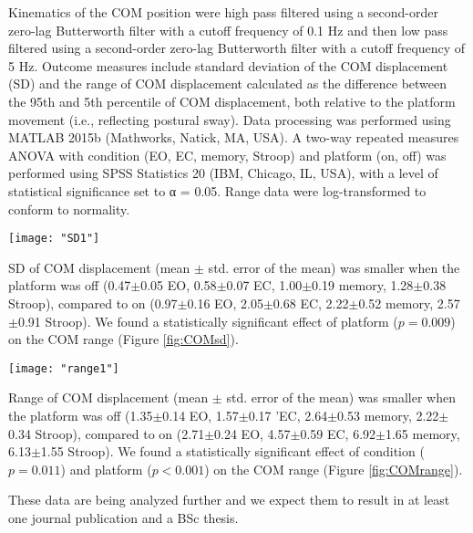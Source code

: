 Kinematics of the COM position were high pass filtered using a second-order zero-lag Butterworth filter with a cutoff frequency of 0.1 Hz and then low pass filtered using a second-order zero-lag Butterworth filter with a cutoff frequency of 5 Hz. Outcome measures include standard deviation of the COM displacement (SD) and the range of COM displacement calculated as the difference between the 95th and 5th percentile of COM displacement, both relative to the platform movement (i.e., reflecting postural sway).
Data processing was performed using MATLAB 2015b (Mathworks, Natick, MA, USA). A two-way repeated measures ANOVA with condition (EO, EC, memory, Stroop) and platform (on, off) was performed using SPSS Statistics 20 (IBM, Chicago, IL, USA), with a level of statistical significance set to α = 0.05. Range data were log-transformed to conform to normality.

\begin{figure*}
	\centering
	\texttt{[image: "SD1"]}
	\caption{SD of the COM displacement (mm).}
	\label{fig:COMsd}
\end{figure*}

SD of COM displacement (mean $\pm$ std. error of the mean) was smaller when the platform was off (0.47$\pm$0.05 EO, 0.58$\pm$0.07 EC, 1.00$\pm$0.19 memory, 1.28$\pm$0.38 Stroop), compared to on (0.97$\pm$0.16 EO, 2.05$\pm$0.68 EC, 2.22$\pm$0.52 memory, 2.57$\pm$0.91 Stroop). We found a statistically significant effect of platform ($p = 0.009$) on the COM range (Figure \ref{fig:COMsd}).

\begin{figure*}
	\centering
	\texttt{[image: "range1"]}
	\caption{Range of the COM displacement (mm).}
	\label{fig:COMrange}
\end{figure*}

Range of COM displacement (mean $\pm$ std. error of the mean) was smaller when the platform was off (1.35$\pm$0.14 EO, 1.57$\pm$0.17 'EC, 2.64$\pm$0.53 memory, 2.22$\pm$0.34 Stroop), compared to on (2.71$\pm$0.24 EO, 4.57$\pm$0.59 EC, 6.92$\pm$1.65 memory, 6.13$\pm$1.55 Stroop). We found a statistically significant effect of condition ($p = 0.011$) and platform ($p < 0.001$) on the COM range (Figure \ref{fig:COMrange}).

These data are being analyzed further and we expect them to result in at least one journal publication and a BSc thesis.